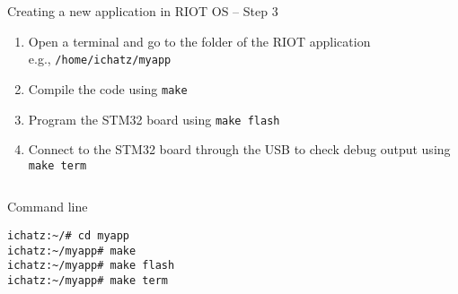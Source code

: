 \documentclass[aspectratio=169]{beamer}
\newcounter{saveenumi}
\newcommand{\conti}{\setcounter{enumi}{\value{saveenumi}}}
\begin{document}
\begin{frame}[fragile]{Creating a new application in RIOT OS -- Step 3} 

\begin{enumerate}

\conti

\item<1-> Open a terminal and go to the folder of the RIOT application\\
e.g., \alert{\texttt{/home/ichatz/myapp}}

\item<2-> Compile the code using \texttt{make}

\item<3-> Program the STM32 board using \texttt{make flash}

\item<4-> Connect to the STM32 board through the USB to check debug output
using \texttt{make term}

\end{enumerate}

\vspace{.2cm}

\begin{columns}

\begin{alertblock}{Command line}
\begin{verbatim}
ichatz:~/# cd myapp
ichatz:~/myapp# make
ichatz:~/myapp# make flash
ichatz:~/myapp# make term
\end{verbatim}
\end{alertblock}


\end{columns}

\vspace{4cm}
\end{frame}
\end{document}
